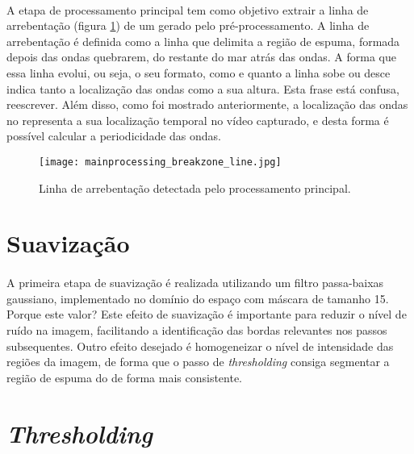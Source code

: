 \paragraph{}A etapa de processamento principal tem como objetivo extrair a linha de arrebentação (figura \ref{FigLinhaArrebentacao}) de um \timestack gerado pelo pré-processamento. A linha de arrebentação é definida como a linha que delimita a região de espuma, formada depois das ondas quebrarem, do restante do mar atrás das ondas. A forma que essa linha evolui, ou seja, o seu formato, como e quanto a linha sobe ou desce indica tanto a localização das ondas como a sua altura. Esta frase está confusa, reescrever. Além disso, como foi mostrado anteriormente, a localização das ondas no \timestack representa a sua localização temporal no vídeo capturado, e desta forma é possível calcular a periodicidade das ondas.
\begin{figure}[h]
\begin{center}
  \texttt{[image: mainprocessing\_breakzone\_line.jpg]}
  \caption[\small{Linha de arrebentação detectada pelo processamento principal.}]{\label{FigLinhaArrebentacao} \small{Linha de arrebentação detectada pelo processamento principal.}}
\end{center}
\end{figure}
\section{Suavização}
\paragraph{}A primeira etapa de suavização é realizada utilizando um filtro passa-baixas gaussiano, implementado no domínio do espaço com máscara de tamanho 15. Porque este valor? Este efeito de suavização é importante para reduzir o nível de ruído na imagem, facilitando a identificação das bordas relevantes nos passos subsequentes. 
Outro efeito desejado é homogeneizar o nível de intensidade das regiões da imagem, de forma que o passo de \textit{thresholding} consiga segmentar a região de espuma do \timestack de forma mais consistente.
\section{\textit{Thresholding}}
